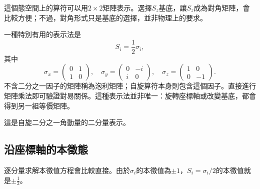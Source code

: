 \begin{classroomqa}
\end{classroomqa}

這個態空間上的算符可以用\(2\times2\)矩陣表示。選擇\(S_z\)基底，讓\(S_z\)成為對角矩陣，會比較方便；不過，對角形式只是基底的選擇，並非物理上的要求。

\begin{classroomqa}
\end{classroomqa}

\begin{classroomqa}
\end{classroomqa}

一種特別有用的表示法是
\begin{equation}
S_i=\frac12\sigma_i,
\end{equation}
其中
\begin{equation}
\sigma_x=
\begin{pmatrix}
0&1\\
1&0
\end{pmatrix},
\quad
\sigma_y=
\begin{pmatrix}
0&-i\\
i&0
\end{pmatrix},
\quad
\sigma_z=
\begin{pmatrix}
1&0\\
0&-1
\end{pmatrix}.
\end{equation}
不含二分之一因子的矩陣稱為泡利矩陣；自旋算符本身則包含這個因子。直接進行矩陣乘法即可驗證對易關係。這種表示法並非唯一：旋轉座標軸或改變基底，都會得到另一組等價矩陣。

這是自旋二分之一角動量的二分量表示。

\subsection{沿座標軸的本徵態}

逐分量求解本徵值方程會比較直接。由於\(\sigma_i\)的本徵值為\(\pm1\)，\(S_i=\sigma_i/2\)的本徵值就是\(\pm\tfrac12\)。

